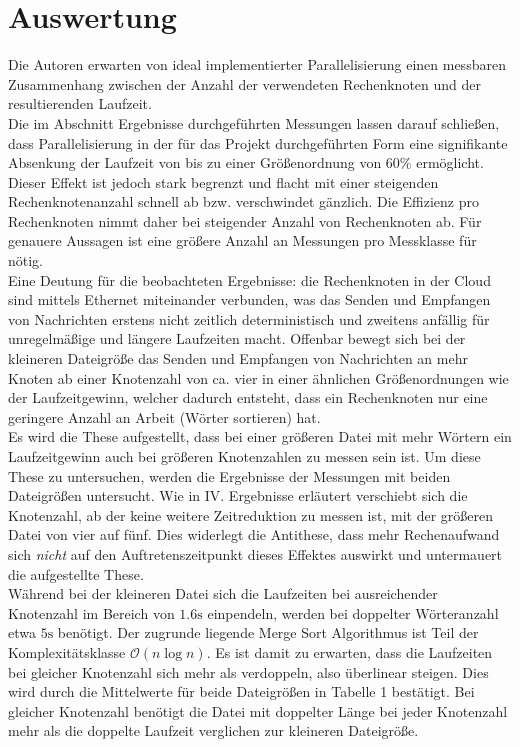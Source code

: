 \section{Auswertung}
Die Autoren erwarten von ideal implementierter Parallelisierung einen messbaren Zusammenhang zwischen der Anzahl der verwendeten Rechenknoten und der resultierenden Laufzeit.
\\
Die im Abschnitt Ergebnisse durchgeführten Messungen lassen darauf schließen, dass Parallelisierung in der für das Projekt durchgeführten Form eine signifikante Absenkung der Laufzeit von bis zu einer Größenordnung von 60\% ermöglicht. Dieser Effekt ist jedoch stark begrenzt und flacht mit einer steigenden Rechenknotenanzahl schnell ab bzw. verschwindet gänzlich. Die Effizienz pro Rechenknoten nimmt daher bei steigender Anzahl von Rechenknoten ab. Für genauere Aussagen ist eine größere Anzahl an Messungen pro Messklasse für nötig.
\\
Eine Deutung für die beobachteten Ergebnisse: die Rechenknoten in der Cloud sind mittels Ethernet miteinander verbunden, was das Senden und Empfangen von Nachrichten erstens nicht zeitlich deterministisch und zweitens anfällig für unregelmäßige und längere Laufzeiten macht. Offenbar bewegt sich bei der kleineren Dateigröße das Senden und Empfangen von Nachrichten an mehr Knoten ab einer Knotenzahl von ca. vier in einer ähnlichen Größenordnungen wie der Laufzeitgewinn, welcher dadurch entsteht, dass ein Rechenknoten nur eine geringere Anzahl an Arbeit (Wörter sortieren) hat. 
\\
Es wird die These aufgestellt, dass bei einer größeren Datei mit mehr Wörtern ein Laufzeitgewinn auch bei größeren Knotenzahlen zu messen sein ist.
Um diese These zu untersuchen, werden die Ergebnisse der Messungen mit beiden Dateigrößen untersucht. Wie in IV. Ergebnisse erläutert verschiebt sich die Knotenzahl, ab der keine weitere Zeitreduktion zu messen ist, mit der größeren Datei von vier auf fünf. Dies widerlegt die Antithese, dass mehr Rechenaufwand sich \textit{nicht} auf den Auftretenszeitpunkt dieses Effektes auswirkt und untermauert die aufgestellte These.
\\
Während bei der kleineren Datei sich die Laufzeiten bei ausreichender Knotenzahl im Bereich von $1.6\text{s}$ einpendeln, werden bei doppelter Wörteranzahl etwa $5\text{s}$ benötigt. Der zugrunde liegende Merge Sort Algorithmus ist Teil der Komplexitätsklasse ${\mathcal{O}(n\log{n})}$. Es ist damit zu erwarten, dass die Laufzeiten bei gleicher Knotenzahl sich mehr als verdoppeln, also überlinear steigen. Dies wird durch die Mittelwerte für beide Dateigrößen in Tabelle 1 bestätigt. Bei gleicher Knotenzahl benötigt die Datei mit doppelter Länge bei jeder Knotenzahl mehr als die doppelte Laufzeit verglichen zur kleineren Dateigröße.
